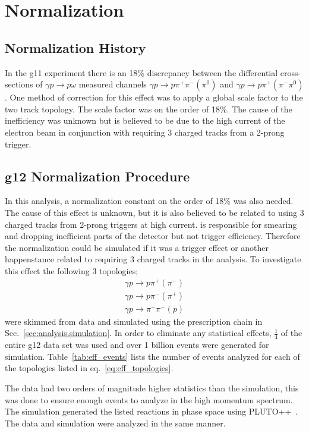 \section{Normalization}\label{sec:results.normalization}
\subsection{Normalization History}
In the g11 experiment there is an 18\% discrepancy between the differential cross-sections of $\gamma p \rightarrow p \omega$ measured channels $\gamma p \rightarrow p \pi^+ \pi^- (\pi^0)$ and $\gamma p \rightarrow p \pi^+ (\pi^- \pi^0)$. One method of correction for this effect was to apply a global scale factor to the two track topology. The scale factor was on the order of 18\%. The cause of the inefficiency was unknown but is believed to be due to the high current of the electron beam in conjunction with requiring 3 charged tracks from a 2-prong trigger.
\subsection{g12 Normalization Procedure}
In this analysis, a normalization constant on the order of 18\% was also needed. The cause of this effect is unknown, but it is also believed to be related to using 3 charged tracks from 2-prong triggers at high current.  is responsible for smearing and dropping inefficient parts of the detector but not trigger efficiency. Therefore the normalization could be simulated if it was a trigger effect or another happenstance related to requiring 3 charged tracks in the analysis. To investigate this effect the following 3 topologies; 
\begin{align}\label{eq:eff_topologies}
\gamma p \rightarrow p \pi^+ (\pi^-) \nonumber\\
\gamma p \rightarrow p \pi^- (\pi^+)  \nonumber\\
\gamma p \rightarrow \pi^+ \pi^- (p)
\end{align}  
were skimmed from data and simulated using the prescription chain in Sec.~\ref{sec:analysis.simulation}. In order to eliminate any statistical effects, $\frac{1}{4}$ of the entire g12 data set was used and over 1 billion events were generated for simulation. Table~\ref{tab:eff_events} lists the number of events analyzed for each of the topologies listed in eq.~\ref{eq:eff_topologies}.

The data had two orders of magnitude higher statistics than the simulation, this was done to ensure enough events to analyze in the high momentum spectrum. The simulation generated the listed reactions in phase space using PLUTO++~\cite{PLUTO}. The data and simulation were analyzed in the same manner.

